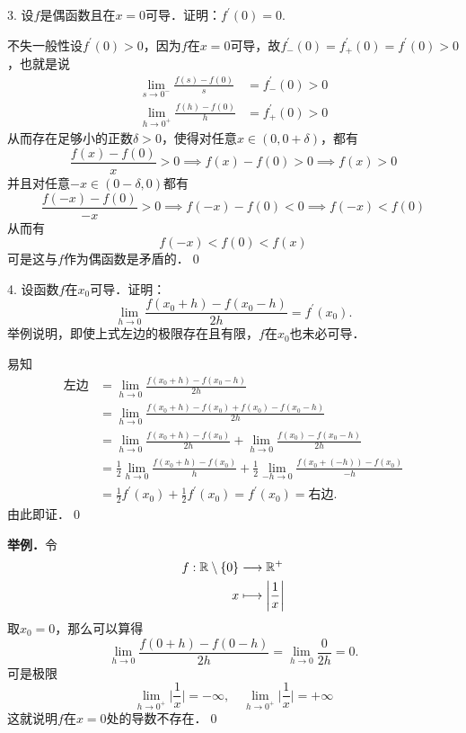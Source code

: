 3. 设$f$是偶函数且在$x=0$可导．证明：$f^{\prime}(0)=0$.

\prove 不失一般性设$f^{\prime}(0)>0$，因为$f$在$x=0$可导，故$f^{\prime}_{-}(0)=f^{\prime}_{+}(0)=f^{\prime}(0) > 0$，也就是说
\begin{align}
    \lim_{s \to 0^-} \frac{f(s)-f(0)}{s} &= f^{\prime}_{-}(0) > 0 \\
    \lim_{h \to 0^+} \frac{f(h)-f(0)}{h} &= f^{\prime}_{+}(0) > 0 
\end{align}
从而存在足够小的正数$\delta > 0$，使得对任意$x \in (0,0+\delta)$，都有
\begin{equation}
    \frac{f(x)-f(0)}{x} > 0 \implies f(x) - f(0) > 0 \implies f(x) > 0
\end{equation}
并且对任意$-x \in (0-\delta, 0)$都有
\begin{equation}
    \frac{f(-x)-f(0)}{-x} > 0 \implies f(-x)-f(0) < 0 \implies f(-x) < f(0)
\end{equation}
从而有
\begin{equation}
    f(-x) < f(0) < f(x)
\end{equation}
可是这与$f$作为偶函数是矛盾的．\qed\bigskip

4. 设函数$f$在$x_0$可导．证明：
\begin{equation*}
    \lim_{h \to 0} \frac{f(x_0+h)-f(x_0-h)}{2h} = f^{\prime}(x_0).
\end{equation*}
举例说明，即使上式左边的极限存在且有限，$f$在$x_0$也未必可导．

\prove 易知
\begin{align}
    \text{左边} &= \lim_{h \to 0} \frac{f(x_0+h)-f(x_0-h)}{2h} \\
    &= \lim_{h \to 0} \frac{f(x_0 + h) - f(x_0) + f(x_0) - f(x_0 - h)}{2h} \\
    &= \lim_{h \to 0} \frac{f(x_0 + h) - f(x_0)}{2h} + \lim_{h \to 0} \frac{f(x_0)-f(x_0-h)}{2h} \\
    &= \frac{1}{2} \lim_{h \to 0} \frac{f(x_0 + h) - f(x_0)}{h} + \frac{1}{2} \lim_{-h \to 0} \frac{f(x_0 + (- h)) - f(x_0)}{-h} \\
    &= \frac{1}{2} f^{\prime} (x_0) + \frac{1}{2} f^{\prime} (x_0) = f^{\prime} (x_0) = \text{右边}.
\end{align}
由此即证．\qed\bigskip

\textbf{举例．}令
\begin{align}
    f: \mathbb{R} \setminus \{ 0 \} &\longrightarrow \mathbb{R}^+ \\
    x &\longmapsto \bigg\lvert \frac{1}{x} \bigg\rvert
\end{align}
取$x_0 = 0$，那么可以算得
\begin{equation}
    \lim_{h \to 0} \frac{f(0 + h) - f(0-h)}{2h} = \lim_{h \to 0} \frac{0}{2h} = 0.
\end{equation}
可是极限
\begin{equation}
    \lim_{h \to 0^+} \bigg\lvert \frac{1}{x} \bigg\lvert = -\infty, \quad \lim_{h \to 0^+} \bigg\lvert \frac{1}{x} \bigg\rvert = + \infty
\end{equation}
这就说明$f$在$x = 0$处的导数不存在．\qed\bigskip

